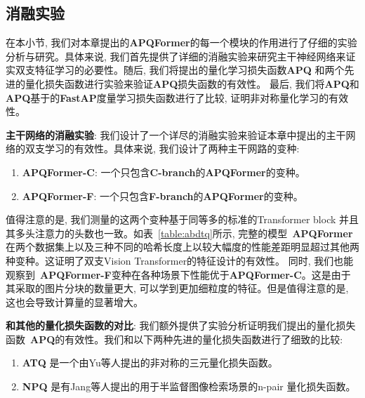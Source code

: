 \subsection{消融实验}
在本小节, 我们对本章提出的\textbf{APQFormer}的每一个模块的作用进行了仔细的实验分析与研究。具体来说, 我们首先提供了详细的消融实验来研究主干神经网络来证实双支特征学习的必要性。随后, 我们将提出的量化学习损失函数\textbf{APQ} 和两个先进的量化损失函数进行实验来验证\textbf{APQ}损失函数的有效性。 最后, 我们将\textbf{APQ}和\textbf{APQ}基于的\textbf{FastAP}度量学习损失函数进行了比较, 证明非对称量化学习的有效性。\par
\textbf{主干网络的消融实验}: 我们设计了一个详尽的消融实验来验证本章中提出的主干网络的双支学习的有效性。具体来说, 我们设计了两种主干网路的变种:
\begin{enumerate}
    \item \textbf{APQFormer-C}: 一个只包含\textbf{C-branch}的\textbf{APQFormer}的变种。
    \item \textbf{APQFormer-F}: 一个只包含\textbf{F-branch}的\textbf{APQFormer}的变种。
\end{enumerate}
值得注意的是, 我们测量的这两个变种基于同等多的标准的Transformer block 并且其多头注意力的头数也一致。如表~\ref{table:abdtq}所示, 完整的模型~\textbf{APQFormer} 在两个数据集上以及三种不同的哈希长度上以较大幅度的性能差距明显超过其他两种变种。这证明了双支Vision Transformer的特征设计的有效性。 同时, 我们也能观察到~\textbf{APQFormer-F}变种在各种场景下性能优于\textbf{APQFormer-C}。这是由于其采取的图片分块的数量更大, 可以学到更加细粒度的特征。但是值得注意的是, 这也会导致计算量的显著增大。\par
\textbf{和其他的量化损失函数的对比}:  我们额外提供了实验分析证明我们提出的量化损失函数~\textbf{APQ}的有效性。我们和以下两种先进的量化损失函数进行了细致的比较:
\begin{enumerate}
    \item \textbf{ATQ} 是一个由Yu等人\cite{yu2018product}提出的非对称的三元量化损失函数。
    \item \textbf{NPQ} 是有Jang等人\cite{jang2020generalized}提出的用于半监督图像检索场景的n-pair 量化损失函数。
\end{enumerate}


